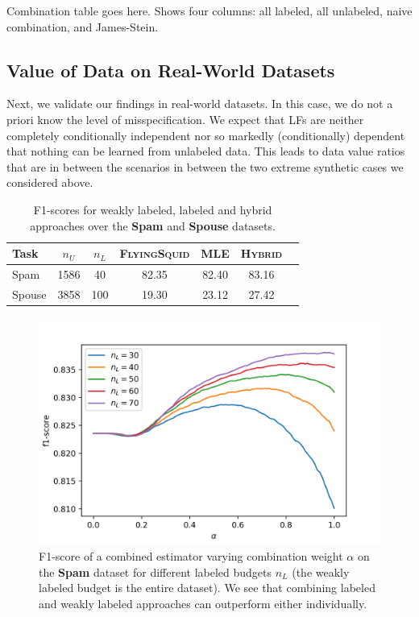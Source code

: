 {\color{red} Combination table goes here. Shows four columns: all labeled, all unlabeled, naive combination, and James-Stein.}


\subsection{Value of Data on Real-World Datasets}
Next, we validate our findings in real-world datasets. In this case, we do not a priori know the level of misspecification. We expect that LFs are neither completely conditionally independent nor so markedly (conditionally) dependent that nothing can be learned from unlabeled data. This leads to data value ratios that are in between the scenarios in between the two extreme synthetic cases we considered above.

\begin{table}[t]
\caption{F1-scores for weakly labeled, labeled and hybrid approaches over the \textbf{Spam} and \textbf{Spouse} datasets.}
\label{sample-table}
\vskip 0.15in
\renewcommand{\arraystretch}{1.25} %
\begin{center}
\begin{small}
\begin{tabular}{lcccccr}
\hline
\textbf{Task} & $n_U$ & $n_L$ & \bfseries{\scshape{FlyingSquid}} & \bfseries{\scshape{MLE}} & \bfseries{\scshape{Hybrid}} \\
\hline
Spam    & 1586 & 40 & 82.35 & 82.40 & 83.16 \\
Spouse  & 3858 & 100 & 19.30 & 23.12 & 27.42 \\
\hline
\end{tabular}
\end{small}
\end{center}
\vskip -0.1in
\end{table}

\begin{figure}
    \centering
    \includegraphics[width=.48\textwidth]{figures/spam_combined_estimator.png}
    \caption{F1-score of a combined estimator varying combination weight $\alpha$ on the \textbf{Spam} dataset for different labeled budgets $n_L$ (the weakly labeled budget is the entire dataset). We see that combining labeled and weakly labeled approaches can outperform either individually.}
    \label{fig:spam_combined_estimator}
\end{figure}

